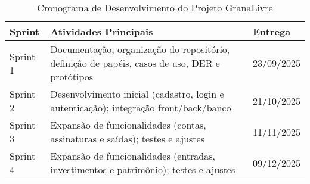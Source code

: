 \begin{table}[h!]
\centering
\caption{Cronograma de Desenvolvimento do Projeto GranaLivre}
\label{tab:cronograma}
\renewcommand{\arraystretch}{1.3}
\begin{tabular}{@{}p{3.2cm} p{7cm} p{2.5cm}@{}}
\toprule
\textbf{Sprint} & \textbf{Atividades Principais} & \textbf{Entrega} \\
\midrule
Sprint 1 & Documentação, organização do repositório, definição de papéis, casos de uso, DER e protótipos & 23/09/2025 \\
Sprint 2 & Desenvolvimento inicial (cadastro, login e autenticação); integração front/back/banco & 21/10/2025 \\
Sprint 3 & Expansão de funcionalidades (contas, assinaturas e saídas); testes e ajustes & 11/11/2025 \\
Sprint 4 & Expansão de funcionalidades (entradas, investimentos e patrimônio); testes e ajustes & 09/12/2025 \\
\bottomrule
\end{tabular}
\end{table}